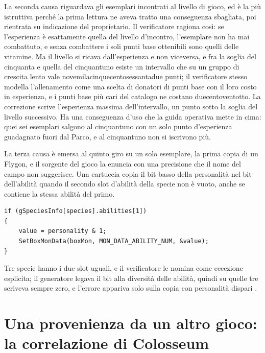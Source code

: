 La seconda causa riguardava gli esemplari incontrati al livello di gioco, ed è la più istruttiva perché la prima lettura ne aveva tratto una conseguenza sbagliata, poi rientrata su indicazione del proprietario. Il verificatore ragiona così: se l'esperienza è esattamente quella del livello d'incontro, l'esemplare non ha mai combattuto, e senza combattere i soli punti base ottenibili sono quelli delle vitamine. Ma il livello si ricava dall'esperienza e non viceversa, e fra la soglia del cinquanta e quella del cinquantuno esiste un intervallo che su un gruppo di crescita lento vale novemilacinquecentosessantadue punti; il verificatore stesso modella l'allenamento come una scelta di donatori di punti base con il loro costo in esperienza, e i punti base più cari del catalogo ne costano duecentoventotto. La correzione scrive l'esperienza massima dell'intervallo, un punto sotto la soglia del livello successivo. Ha una conseguenza d'uso che la guida operativa mette in cima: quei sei esemplari salgono al cinquantuno con un solo punto d'esperienza guadagnato fuori dal Parco, e al cinquantuno non si iscrivono più.

La terza causa è emersa al quinto giro su un solo esemplare, la prima copia di un Flygon, e il sorgente del gioco la enuncia con una precisione che il nome del campo non suggerisce. Una cartuccia copia il bit basso della personalità nel bit dell'abilità quando il secondo slot d'abilità della specie non è vuoto, anche se contiene la stessa abilità del primo.

\begin{lstlisting}[style=c,caption={Da \texttt{CreateBoxMon} in \texttt{src/pokemon.c}, riga 2296: il bit dell'abilità segue la personalità se il secondo slot esiste, non se le due abilità differiscono.}]
if (gSpeciesInfo[species].abilities[1])
{
    value = personality & 1;
    SetBoxMonData(boxMon, MON_DATA_ABILITY_NUM, &value);
}
\end{lstlisting}

Tre specie hanno i due slot uguali, e il verificatore le nomina come eccezione esplicita; il generatore legava il bit alla diversità delle abilità, quindi su quelle tre scriveva sempre zero, e l'errore appariva solo sulla copia con personalità dispari \cite{pokeemerald}.

\section{Una provenienza da un altro gioco: la correlazione di Colosseum}

